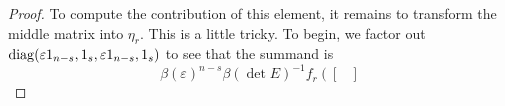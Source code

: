\begin{proof}
	To compute the contribution of this element, it remains to transform the middle matrix into $\eta_r$. This is a little tricky. To begin, we factor out $\operatorname{diag}(\varepsilon1_{n-s},1_s,\varepsilon1_{n-s},1_s)$ to see that the summand is
    \[\beta(\varepsilon)^{n-s}\beta(\det E)^{-1}f_r\left(\begin{bmatrix}

\end{bmatrix}\]
\end{proof}
